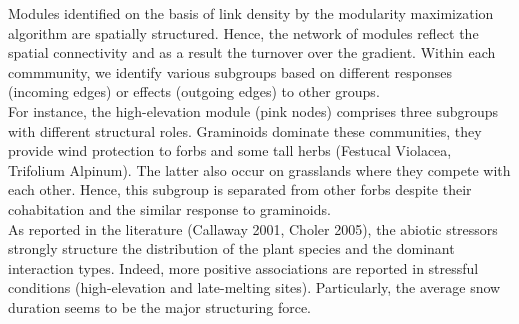 \documentclass[]{article}
\begin{document}
\noindent Modules identified on the basis of link density by the modularity maximization algorithm are spatially structured. Hence, the network of modules reflect the spatial connectivity and as a result the turnover over the gradient. Within each commmunity, we identify various subgroups based on different responses (incoming edges) or effects (outgoing edges) to other groups. \\

\noindent For instance, the high-elevation module (pink nodes) comprises three subgroups with different structural roles. Graminoids dominate these communities, they provide wind protection to forbs and some tall herbs (Festucal Violacea, Trifolium Alpinum). The latter also occur on grasslands where they compete with each other. Hence, this subgroup is separated from other forbs despite their cohabitation and the similar response to graminoids. \\

\noindent As reported in the literature (Callaway 2001, Choler 2005), the abiotic stressors strongly structure the distribution of the plant species and the dominant interaction types. Indeed, more positive associations are reported in stressful conditions (high-elevation and late-melting sites). Particularly, the average snow duration seems to be the major structuring force. \\
     
\end{document}
